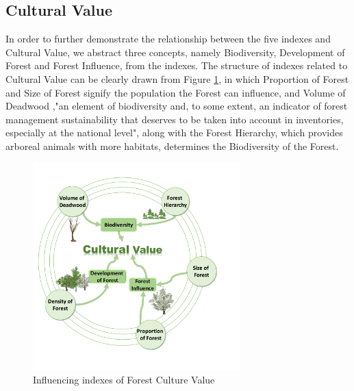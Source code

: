 \documentclass{mcmthesis}
\numberwithin{figure}{section}
\numberwithin{table}{section}
\numberwithin{equation}{section}
\begin{document}
\subsection{Cultural Value}

\par
In order to further demonstrate the relationship between the five indexes and 
Cultural Value, we abstract three concepts, namely Biodiversity, Development of 
Forest and Forest Influence, from the indexes. The structure of indexes related to 
Cultural Value can be clearly drawn from Figure \ref{Index_CulVal}, 
in which Proportion of Forest and Size
of Forest signify the population the Forest can influence, and Volume of Deadwood
,"an element of biodiversity and, to some extent, an indicator of forest 
management sustainability that deserves to be taken into account in inventories,
especially at the national level"\citep{rondeux2010review}, along with the 
Forest Hierarchy, which provides arboreal 
animals with more habitats, determines the Biodiversity of the Forest.



\begin{figure}[htbp]
  \centering
  \includegraphics[width = 8cm]{code&pic/Model2.pdf}
  \caption{Influencing indexes of Forest Culture Value}\label{Index_CulVal}
\end{figure}
\end{document}
